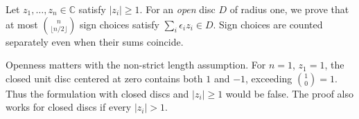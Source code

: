 Let $z_1,\ldots,z_n\in\mathbb C$ satisfy $|z_i|\ge1$. For an \emph{open} disc $D$ of radius one, we prove that at most $\binom n{\lfloor n/2\rfloor}$ sign choices satisfy $\sum_i\epsilon_i z_i\in D$. Sign choices are counted separately even when their sums coincide.

Openness matters with the non-strict length assumption. For $n=1$, $z_1=1$, the closed unit disc centered at zero contains both $1$ and $-1$, exceeding $\binom10=1$. Thus the formulation with closed discs and $|z_i|\ge1$ would be false. The proof also works for closed discs if every $|z_i|>1$.
